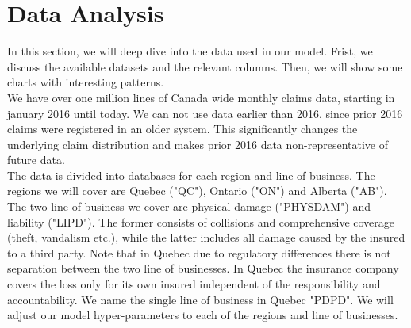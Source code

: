 \section{Data Analysis}\label{Section_dataAnalysis}
In this section, we will deep dive into the data used in our model. Frist, we discuss the available datasets and the relevant columns. Then, we will show some charts with interesting patterns.\\

We have over one million lines of Canada wide monthly claims data, starting in january 2016 until today. We can not use data earlier than 2016, since prior 2016 claims were registered in an older system. This significantly changes the underlying claim distribution and makes prior 2016 data non-representative of future data.\\
The data is divided into databases for each region and line of business. The regions we will cover are Quebec ("QC"), Ontario ("ON") and Alberta ("AB"). The two line of business we cover are physical damage ("PHYSDAM") and liability ("LIPD"). The former consists of collisions and comprehensive coverage (theft, vandalism etc.), while the latter includes all damage caused by the insured to a third party. Note that in Quebec due to regulatory differences there is not separation between the two line of businesses. In Quebec the insurance company covers the loss only for its own insured independent of the responsibility and accountability. We name the single line of business in Quebec "PDPD". We will adjust our model hyper-parameters to each of the regions and line of businesses. 

